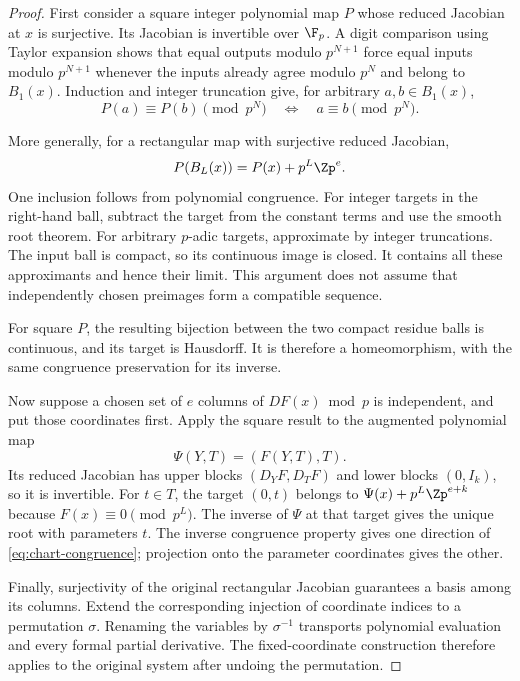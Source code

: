 \begin{proof}
First consider a square integer polynomial map $P$ whose reduced Jacobian
at $x$ is surjective. Its Jacobian is invertible over $\F_p$. A digit
comparison using Taylor expansion shows that equal outputs modulo
$p^{N+1}$ force equal inputs modulo $p^{N+1}$ whenever the inputs already
agree modulo $p^N$ and belong to $B_1(x)$. Induction and integer truncation
give, for arbitrary $a,b\in B_1(x)$,
\[
 P(a)\equiv P(b)\pmod{p^N}
 \quad\Longleftrightarrow\quad a\equiv b\pmod{p^N}.
\]

More generally, for a rectangular map with surjective reduced Jacobian,
\begin{equation}\label{eq:polynomial-ball-image}
 P(B_L(x))=P(x)+p^L\Zp^e.
\end{equation}
One inclusion follows from polynomial congruence. For integer targets in
the right-hand ball, subtract the target from the constant terms and use
the smooth root theorem. For arbitrary $p$-adic targets, approximate by
integer truncations. The input ball is compact, so its continuous image is
closed. It contains all these approximants and hence their limit. This
argument does not assume that independently chosen preimages form a
compatible sequence.

For square $P$, the resulting bijection between the two compact residue
balls is continuous, and its target is Hausdorff. It is therefore a
homeomorphism, with the same congruence preservation for its inverse.

Now suppose a chosen set of $e$ columns of $DF(x)\bmod p$ is independent,
and put those coordinates first. Apply the square result to the augmented
polynomial map
\[
 \Psi(Y,T)=(F(Y,T),T).
\]
Its reduced Jacobian has upper blocks $(D_YF,D_TF)$ and lower blocks
$(0,I_k)$, so it is invertible. For $t\in T$, the target $(0,t)$ belongs
to $\Psi(x)+p^L\Zp^{e+k}$ because $F(x)\equiv0\pmod{p^L}$.
The inverse of $\Psi$ at that target gives the unique root with parameters
$t$. The inverse congruence property gives one direction of
\eqref{eq:chart-congruence}; projection onto the parameter coordinates
gives the other.

Finally, surjectivity of the original rectangular Jacobian guarantees a
basis among its columns. Extend the corresponding injection of coordinate
indices to a permutation $\sigma$. Renaming the variables by
$\sigma^{-1}$ transports polynomial evaluation and every formal partial
derivative. The fixed-coordinate construction therefore applies to the
original system after undoing the permutation.
\end{proof}

